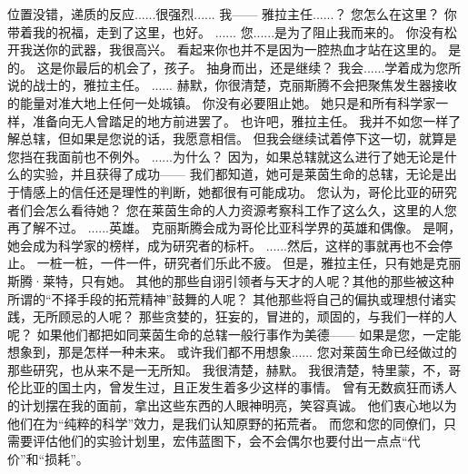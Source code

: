 \documentclass[openany]{book}
\begin{document}
\begin{dialogue}
     位置没错，递质的反应......很强烈......
     我——
     雅拉主任......？
     您怎么在这里？
     你带着我的祝福，走到了这里，也好。
     ......
     您......是为了阻止我而来的。
     你没有松开我送你的武器，我很高兴。
     看起来你也并不是因为一腔热血才站在这里的。
     是的。
     这是你最后的机会了，孩子。
     抽身而出，还是继续？
     我会......学着成为您所说的战士的，雅拉主任。
     ......
     赫默，你很清楚，克丽斯腾不会把聚焦发生器接收的能量对准大地上任何一处城镇。
     你没有必要阻止她。
     她只是和所有科学家一样，准备向无人曾踏足的地方前进罢了。
     也许吧，雅拉主任。
     我并不如您一样了解总辖，但如果是您说的话，我愿意相信。
     但我会继续试着停下这一切，就算是您挡在我面前也不例外。
     ......为什么？
     因为，如果总辖就这么进行了她无论是什么的实验，并且获得了成功——
     我们都知道，她可是莱茵生命的总辖，无论是出于情感上的信任还是理性的判断，她都很有可能成功。
     您认为，哥伦比亚的研究者们会怎么看待她？
     您在莱茵生命的人力资源考察科工作了这么久，这里的人您再了解不过。
     ......英雄。
     克丽斯腾会成为哥伦比亚科学界的英雄和偶像。
     是啊，她会成为科学家的榜样，成为研究者的标杆。
     ......然后，这样的事就再也不会停止。
     一桩一桩，一件一件，研究者们乐此不疲。
     但是，雅拉主任，只有她是克丽斯腾·莱特，只有她。
     其他的那些自诩引领者与天才的人呢？其他的那些被这种所谓的“不择手段的拓荒精神”鼓舞的人呢？
     其他那些将自己的偏执或理想付诸实践，无所顾忌的人呢？
     那些贪婪的，狂妄的，冒进的，顽固的，与我们一样的人呢？
     如果他们都把如同莱茵生命的总辖一般行事作为美德——
     如果是您，一定能想象到，那是怎样一种未来。
     或许我们都不用想象......
     您对莱茵生命已经做过的那些研究，也从来不是一无所知。
     我很清楚，赫默。
     我很清楚，特里蒙，不，哥伦比亚的国土内，曾发生过，且正发生着多少这样的事情。
     曾有无数疯狂而诱人的计划摆在我的面前，拿出这些东西的人眼神明亮，笑容真诚。
     他们衷心地以为他们在为“纯粹的科学”效力，是我们认知原野的拓荒者。
     而您和您的同僚们，只需要评估他们的实验计划里，宏伟蓝图下，会不会偶尔也要付出一点点“代价”和“损耗”。

\end{dialogue}
\end{document}
